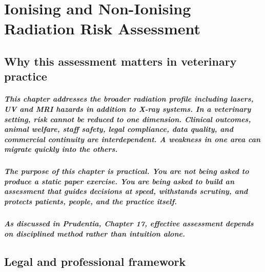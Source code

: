 \chapter{Ionising and Non-Ionising Radiation Risk Assessment}
\label{chap:Ionising and Non-Ionising Radiation Risk Assessment}

\section{Why this assessment matters in veterinary practice}

\paragraph{This chapter addresses the broader radiation profile including lasers, UV and MRI hazards in addition to X-ray systems. In a veterinary setting, risk cannot be reduced to one dimension. Clinical outcomes, animal welfare, staff safety, legal compliance, data quality, and commercial continuity are interdependent. A weakness in one area can migrate quickly into the others.}

\paragraph{The purpose of this chapter is practical. You are not being asked to produce a static paper exercise. You are being asked to build an assessment that guides decisions at speed, withstands scrutiny, and protects patients, people, and the practice itself.}

\paragraph{As discussed in Prudentia, Chapter 17, effective assessment depends on disciplined method rather than intuition alone.}



\section{Legal and professional framework}

